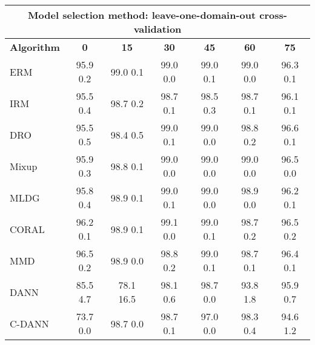 \documentclass{article}
\begin{document}
\begin{center}
\begin{tabular}{lcccccc}
\toprule
\multicolumn{7}{c}{\textbf{Model selection method: leave-one-domain-out cross-validation}} \\
\midrule
\textbf{Algorithm}    & \textbf{0}      & \textbf{15}     & \textbf{30}     & \textbf{45}     & \textbf{60}     & \textbf{75}     \\
\midrule
ERM                       & 95.9  0.2            & 99.0  0.1            & 99.0  0.0            & 99.0  0.1            & 99.0  0.0            & 96.3  0.1            \\
IRM                       & 95.5  0.4            & 98.7  0.2            & 98.7  0.1            & 98.5  0.3            & 98.7  0.1            & 96.1  0.1            \\
DRO                 & 95.5  0.5            & 98.4  0.5            & 99.0  0.1            & 99.0  0.0            & 98.8  0.2            & 96.6  0.1            \\
Mixup                     & 95.9  0.3            & 98.8  0.1            & 99.0  0.0            & 99.0  0.0            & 99.0  0.0            & 96.5  0.0            \\
MLDG                      & 95.8  0.4            & 98.9  0.1            & 99.0  0.1            & 99.0  0.0            & 98.9  0.0            & 96.2  0.1            \\
CORAL                     & 96.2  0.1            & 98.9  0.1            & 99.1  0.0            & 99.0  0.1            & 98.7  0.2            & 96.5  0.2            \\
MMD                       & 96.5  0.2            & 98.9  0.0            & 98.8  0.2            & 99.0  0.1            & 98.7  0.1            & 96.4  0.1            \\
DANN                       & 85.5  4.7            & 78.1  16.5           & 98.1  0.6            & 98.7  0.0            & 93.8  1.8            & 95.9  0.7            \\
C-DANN                   & 73.7  0.0            & 98.7  0.0            & 98.7  0.1            & 97.0  0.0            & 98.3  0.4            & 94.6  1.2            \\
\bottomrule
\end{tabular}
\end{center}
\end{document}
